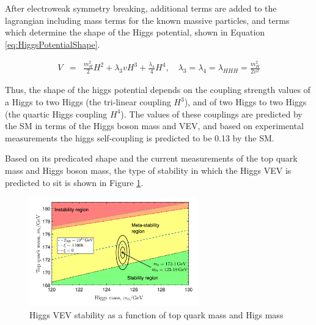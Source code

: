 After electroweak symmetry breaking, additional terms are added to the lagrangian including mass terms for the known massive particles, and terms which determine the shape of the Higgs potential, shown in Equation \ref{eq:HiggsPotentialShape}. 

\begin{eqnarray}
  V &=& \frac{m_H^2}{2}H^2 + \lambda_3 v H^3 + \frac{\lambda_4}{4} H^4,
\quad
 \lambda_3 = \lambda_4 = \lambda_{HHH} = \frac{m_H^2}{2v^2} \label{eq:HiggsPotentialShape}
\end{eqnarray}

Thus, the shape of the higgs potential depends on the coupling strength values of a Higgs to two Higgs (the tri-linear coupling $H^{3}$), and of two Higgs to two Higgs (the quartic Higgs coupling $H^{4}$). The values of these couplings are predicted by the SM in terms of the Higgs boson mass and VEV, and based on experimental measurements the higgs self-coupling is predicted to be 0.13 by the SM.  




Based on its predicated shape and the current measurements of the top quark mass and Higgs boson mass, the type of stability in which the Higgs VEV is predicted to sit is shown in Figure \ref{fig:HH_Stability_Plot}. 

\begin{figure}[H]
    \centering
    \includegraphics[width=0.65\textwidth]{Images/Theory/HH_stability_Plot.png}
    \caption{Higgs VEV stability as a function of top quark mass and Higs mass}
    \label{fig:HH_Stability_Plot}
\end{figure}

